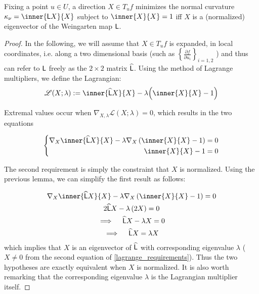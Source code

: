     \begin{theorem}
       	Fixing a point $u \in U$, a direction $X \in T_u f $ minimizes the normal curvature $\kappa_\nu = \inner{\wein X}{X}$ subject to $\inner{X}{X}= 1$
       	iff $X$ is a (normalized) eigenvector of the Weingarten map $\mathsf{L}$.
       	\end{theorem}
    \begin{proof}
       		
       		In the following, we will assume that $X \in T_u f$ is expanded,
       		in local coordinates, i.e. along  a two dimensional basis
       		(such as $\left\{ \frac{\partial f}{\partial u_i}\right\}_{i=1,2}$
       		) and thus can refer to $\mathsf{L}$ freely as the $2\times2$ matrix $\widehat{\mathsf{L}}$.
       		Using the method of Lagrange multipliers, we define the Lagrangian:
       		\begin{equation}
       		\mathscr{L}(X; \lambda) :=
        	\inner{\weinmat X}{X} - \lambda\Big(\inner{X}{X} - 1\Big) 
     \end{equation}
        	
        	Extremal values occur when
        	$\nabla_{X,\lambda} \mathscr{L}(X;\lambda) = 0$,
        	which results in the two equations
        	
     \begin{equation} \label{lagrange_requirements}
     \left\{ \begin{aligned}
      \nabla_X \inner{\weinmat X}{X} - \lambda \nabla_X \left( \inner{X}{X} - 1 \right) = 0 \\
      \inner{X}{X} - 1 = 0
     \end{aligned} \right.
     \end{equation}
     
     The second requirement is simply the constraint that $X$ is normalized.
     Using the previous lemma, we can simplify the first result as follows:
     
     \begin{gather}
     \nabla_X \inner{\weinmat X}{X} - \lambda \nabla_X \left( \inner{X}{X} - 1 \right) = 0 
     \nonumber \\
     2\weinmat X - \lambda \left(2 X \right) = 0  \nonumber \\
     \implies \quad \weinmat X - \lambda X = 0 \nonumber \\
     \implies \quad \weinmat X = \lambda X
     \end{gather}
     which implies that $X$ is an eigenvector of  $\widehat{\mathsf{L}}$ with corresponding eigenvalue $\lambda$ ($X\ne 0 $ from the second equation of \cref{lagrange_requirements}).
     Thus the two hypotheses are exactly equivalent when $X$ is normalized. It is also worth remarking that the corresponding eigenvalue $\lambda$ is the Lagrangian multiplier itself.
       	\end{proof}
       	
